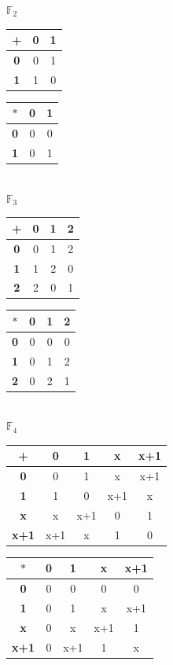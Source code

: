 \documentclass[a4paper]{article}
\begin{document}
\begin{center}
$\mathbb{F}_2 $\\
\begin{tabular}{|c|c|c|}
  \hline
  + & \textbf{0} & \textbf{1} \\
  \hline
  \textbf{0} & 0 & 1 \\
  \hline
  \textbf{1} & 1 & 0 \\
  \hline
\end{tabular}
\begin{tabular}{|c|c|c|}
  \hline
  $*$ & \textbf{0} & \textbf{1} \\
  \hline
  \textbf{0} & 0 & 0\\
  \hline
  \textbf{1} & 0 & 1\\
  \hline
\end{tabular}\\
\vspace{1\baselineskip}
$\mathbb{F}_3 $\\
\begin{tabular}{|c|c|c|c|}
  \hline
  + & \textbf{0} & \textbf{1} & \textbf{2} \\
  \hline
  \textbf{0} & 0 & 1 & 2 \\
  \hline
  \textbf{1} & 1 & 2 & 0 \\
  \hline
  \textbf{2} & 2 & 0 & 1 \\
  \hline
\end{tabular}
\begin{tabular}{|c|c|c|c|}
  \hline
  $*$ & \textbf{0} & \textbf{1} & \textbf{2} \\
  \hline
  \textbf{0} & 0 & 0 & 0 \\
  \hline
  \textbf{1} & 0 & 1 & 2 \\
  \hline
  \textbf{2} & 0 & 2 & 1 \\
  \hline
\end{tabular}\\
\vspace{1\baselineskip}
$\mathbb{F}_4$\\
\begin{tabular}{|c|c|c|c|c|}
  \hline
  + & \textbf{0} & \textbf{1} & \textbf{x} & \textbf{x+1} \\
  \hline
  \textbf{0} & 0 & 1 & x & x+1 \\
  \hline
  \textbf{1} & 1 & 0 & x+1 & x \\
  \hline
  \textbf{x} & x & x+1 & 0 & 1 \\
  \hline
  \textbf{x+1} & x+1 & x & 1 & 0 \\
  \hline
\end{tabular}
\begin{tabular}{|c|c|c|c|c|}
  \hline
  $*$ & \textbf{0} & \textbf{1} & \textbf{x} & \textbf{x+1} \\
  \hline
  \textbf{0} & 0 & 0 & 0 & 0 \\
  \hline
  \textbf{1} & 0 & 1 & x & x+1 \\
  \hline
  \textbf{x} & 0 & x & x+1 & 1 \\
  \hline
  \textbf{x+1} & 0 & x+1 & 1 & x\\
  \hline
\end{tabular}
\end{center}
\newpage
\end{document}

